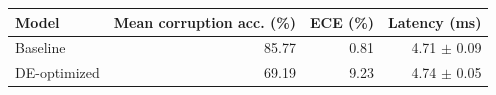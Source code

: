 \begin{tabular}{lrrr}
\toprule
Model & Mean corruption acc. (\%) & ECE (\%) & Latency (ms) \\
\midrule
Baseline & 85.77 & 0.81 & \shortstack{4.71\\$\pm$ 0.09} \\
DE-optimized & 69.19 & 9.23 & \shortstack{4.74\\$\pm$ 0.05} \\
\bottomrule
\end{tabular}
